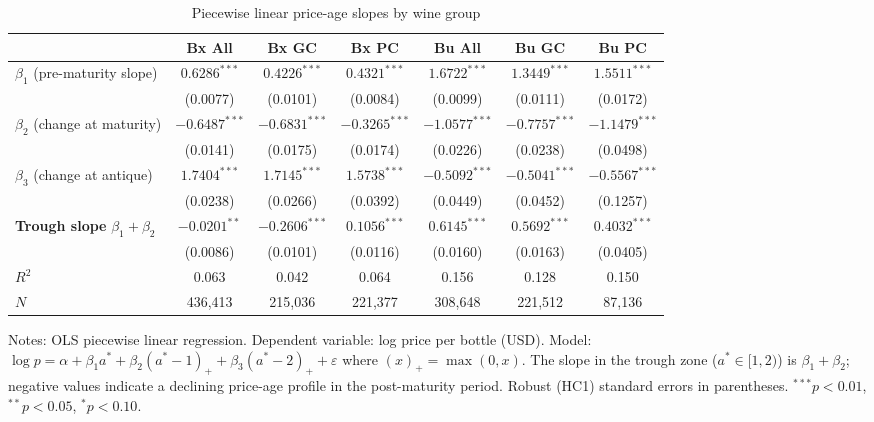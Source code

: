\begin{table}[htbp]
\centering
\caption{Piecewise linear price-age slopes by wine group}
\label{tab:piecewise_slopes}
\small
\begin{threeparttable}
\begin{tabular}{lcccccc}
\toprule
 & \multicolumn{1}{c}{Bx All} & \multicolumn{1}{c}{Bx GC} & \multicolumn{1}{c}{Bx PC} & \multicolumn{1}{c}{Bu All} & \multicolumn{1}{c}{Bu GC} & \multicolumn{1}{c}{Bu PC} \\
\midrule
$\beta_1$ (pre-maturity slope) & $0.6286^{***}$ & $0.4226^{***}$ & $0.4321^{***}$ & $1.6722^{***}$ & $1.3449^{***}$ & $1.5511^{***}$ \\
  & (0.0077) & (0.0101) & (0.0084) & (0.0099) & (0.0111) & (0.0172) \\
$\beta_2$ (change at maturity) & $-0.6487^{***}$ & $-0.6831^{***}$ & $-0.3265^{***}$ & $-1.0577^{***}$ & $-0.7757^{***}$ & $-1.1479^{***}$ \\
  & (0.0141) & (0.0175) & (0.0174) & (0.0226) & (0.0238) & (0.0498) \\
$\beta_3$ (change at antique) & $1.7404^{***}$ & $1.7145^{***}$ & $1.5738^{***}$ & $-0.5092^{***}$ & $-0.5041^{***}$ & $-0.5567^{***}$ \\
  & (0.0238) & (0.0266) & (0.0392) & (0.0449) & (0.0452) & (0.1257) \\
\midrule
\textbf{Trough slope} $\beta_1+\beta_2$ & $-0.0201^{**}$ & $-0.2606^{***}$ & $0.1056^{***}$ & $0.6145^{***}$ & $0.5692^{***}$ & $0.4032^{***}$ \\
  & (0.0086) & (0.0101) & (0.0116) & (0.0160) & (0.0163) & (0.0405) \\
\midrule
$R^2$ & 0.063 & 0.042 & 0.064 & 0.156 & 0.128 & 0.150 \\
$N$ & 436,413 & 215,036 & 221,377 & 308,648 & 221,512 & 87,136 \\
\bottomrule
\end{tabular}
\begin{tablenotes}
\footnotesize
\item Notes: OLS piecewise linear regression. Dependent variable: log price per bottle (USD).
  Model: $\log p = \alpha + \beta_1 a^* + \beta_2 (a^*-1)_+ + \beta_3 (a^*-2)_+ + \varepsilon$
  where $(x)_+ = \max(0,x)$.
  The slope in the trough zone ($a^* \in [1,2)$) is $\beta_1+\beta_2$; negative values indicate
  a declining price-age profile in the post-maturity period.
  Robust (HC1) standard errors in parentheses.
  $^{***}p<0.01$, $^{**}p<0.05$, $^{*}p<0.10$.
\end{tablenotes}
\end{threeparttable}
\end{table}
